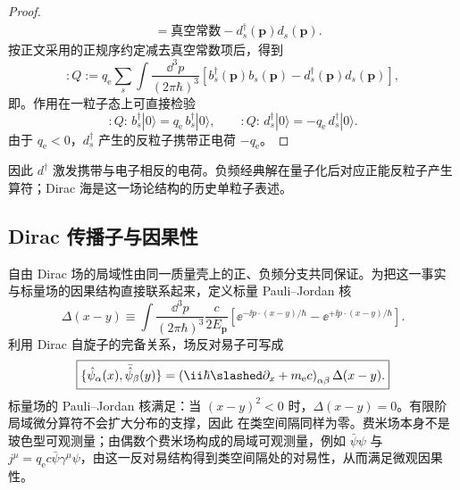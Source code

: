 \begin{proof}
\begin{align*}
&=\text{真空常数}-d_s^\dagger(\mathbf p)d_s(\mathbf p).
\end{align*}
按正文采用的正规序约定减去真空常数项后，得到
\begin{equation*}
:Q:=q_{\mathrm e}\sum_s\int\frac{\dd^3 p}{(2\pi\hbar)^3}
\left[b_s^\dagger(\mathbf p)b_s(\mathbf p)-d_s^\dagger(\mathbf p)d_s(\mathbf p)\right],
\end{equation*}
即。作用在一粒子态上可直接检验
\begin{equation*}
:Q:\,b_s^\dagger|0\rangle=q_{\mathrm e}\,b_s^\dagger|0\rangle,
\qquad
:Q:\,d_s^\dagger|0\rangle=-q_{\mathrm e}\,d_s^\dagger|0\rangle.
\end{equation*}
由于 $q_{\mathrm e}<0$，$d_s^\dagger$ 产生的反粒子携带正电荷 $-q_{\mathrm e}$。
\end{proof}

因此 $d^\dagger$ 激发携带与电子相反的电荷。负频经典解在量子化后对应正能反粒子产生算符；Dirac 海是这一场论结构的历史单粒子表述。

\subsection{Dirac 传播子与因果性}

\begin{proposition}
自由 Dirac 场的局域性由同一质量壳上的正、负频分支共同保证。为把这一事实与标量场的因果结构直接联系起来，定义标量 Pauli--Jordan 核
\begin{equation*}
 \Delta(x-y)
 \equiv
 \int\frac{\dd^3 p}{(2\pi\hbar)^3}\frac{c}{2E_{\mathbf p}}
 \left[
 \ee^{-\ii p\cdot(x-y)/\hbar}
 -\ee^{+\ii p\cdot(x-y)/\hbar}
 \right].
\end{equation*}
利用 Dirac 自旋子的完备关系，场反对易子可写成
\begin{equation}
 \boxed{
 \{\hat\psi_\alpha(x),\bar{\hat\psi}_\beta(y)\}
 =\left(\ii\hbar\slashed\partial_x+m_{\mathrm e} c\right)_{\alpha\beta}
 \Delta(x-y).}
 \label{eq:dirac-PJ-factor-r8}
\end{equation}
标量场的 Pauli--Jordan 核满足：当 $(x-y)^2<0$ 时，$\Delta(x-y)=0$。有限阶局域微分算符不会扩大分布的支撑，因此 在类空间隔同样为零。费米场本身不是玻色型可观测量；由偶数个费米场构成的局域可观测量，例如 $\bar\psi\psi$ 与 $j^\mu=q_{\mathrm e} c\bar\psi\gamma^\mu\psi$，由这一反对易结构得到类空间隔处的对易性，从而满足微观因果性。

\end{proposition}

